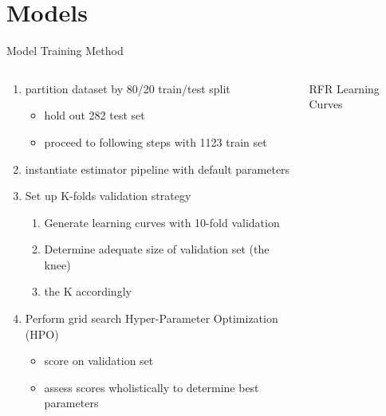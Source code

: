 \documentclass[10pt, aspectratio=169, presentation]{beamer}
\begin{document}
\section{Models}
\label{sec:orga9c4317}
\begin{frame}[label={sec:org25d419c}]{Model Training Method}
\begin{columns}
\begin{column}{0.5\columnwidth}
\begin{enumerate}
\item partition dataset by 80/20 train/test split
\begin{itemize}
\item hold out 282 test set
\item proceed to following steps with 1123 train set
\end{itemize}
\item instantiate estimator pipeline with default parameters
\item Set up K-folds validation strategy
\begin{enumerate}
\item Generate learning curves with 10-fold validation
\item Determine adequate size of validation set (the knee)
\item the K accordingly
\end{enumerate}
\item Perform grid search Hyper-Parameter Optimization (HPO)
\begin{itemize}
\item score on validation set
\item assess scores wholistically to determine best parameters
\end{itemize}
\end{enumerate}
\end{column}

\begin{column}{0.5\columnwidth}
\begin{block}{RFR Learning Curves}
\begin{center}

\end{center}
\end{block}
\end{column}
\end{columns}
\end{frame}
\end{document}
